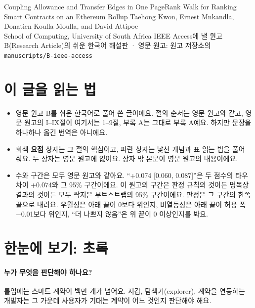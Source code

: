 \documentclass[11pt]{article}
\begin{document}
{Coupling Allowance and Transfer Edges in One PageRank Walk for Ranking Smart Contracts on an Ethereum Rollup}
{Taehong Kwon, Ernest Mnkandla, Donatien Koulla Moulla, and David Attipoe\\
School of Computing, University of South Africa}
{IEEE Access에 낼 원고 B(Research Article)의 쉬운 한국어 해설판 · 영문 원고: 원고 저장소의 \texttt{manuscripts/B-ieee-access}}

\section*{이 글을 읽는 법}

\begin{itemize}
\item 영문 원고 B를 쉬운 한국어로 풀어 쓴 글이에요. 절의 순서는 영문 원고와 같고, 영문 원고의 I–IX절이 여기서는 1–9절, 부록 A는 그대로 부록 A예요. 하지만 문장을 하나하나 옮긴 번역은 아니에요.
\item 회색 \textsf{\textbf{요점}} 상자는 그 절의 핵심이고, 파란 상자는 낯선 개념과 표 읽는 법을 풀어 줘요. 두 상자는 영문 원고에 없어요. 상자 밖 본문이 영문 원고의 내용이에요.
\item 수와 구간은 모두 영문 원고와 같아요. “+0.074 [0.060, 0.087]”은 두 점수의 타우 차이 +0.074와 그 95\% 구간이에요. 이 원고의 구간은 판정 규칙의 것이든 명목상 결과의 것이든 모두 짝지은 부트스트랩의 95\% 구간이에요. 판정은 그 구간의 한쪽 끝으로 내려요. 우월성은 아래 끝이 0보다 위인지, 비열등성은 아래 끝이 허용 폭 −0.01보다 위인지, “더 나쁘지 않음”은 위 끝이 0 이상인지를 봐요.
\end{itemize}

{\small\setcounter{tocdepth}{1}\tableofcontents}

\section*{한눈에 보기: 초록}

\paragraph{누가 무엇을 판단해야 하나요?}
롤업에는 스마트 계약이 백만 개가 넘어요. 지갑, 탐색기(explorer), 계약을 연동하는 개발자는 그 가운데 사용자가 기대는 계약이 어느 것인지 판단해야 해요.
\end{document}
